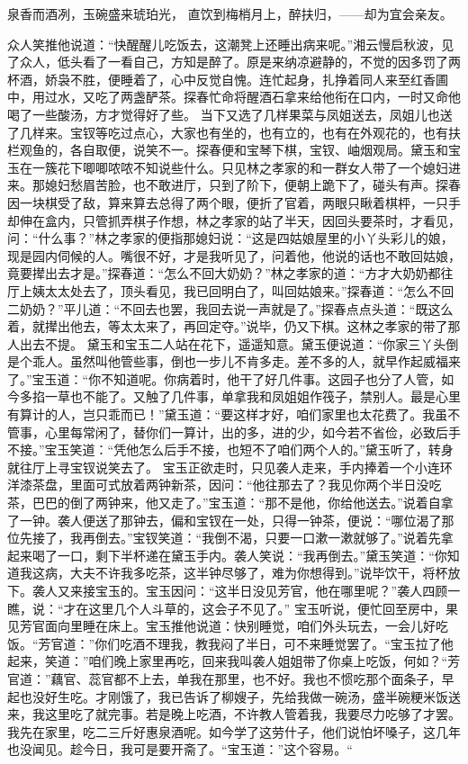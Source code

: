 \documentclass[12pt,oneside]{book}
\begin{document}
泉香而酒冽，玉碗盛来琥珀光，
直饮到梅梢月上，醉扶归，——却为宜会亲友。

众人笑推他说道：“快醒醒儿吃饭去，这潮凳上还睡出病来呢。”湘云慢启秋波，见了众人，低头看了一看自己，方知是醉了。原是来纳凉避静的，不觉的因多罚了两杯酒，娇袅不胜，便睡着了，心中反觉自愧。连忙起身，扎挣着同人来至红香圃中，用过水，又吃了两盏酽茶。探春忙命将醒酒石拿来给他衔在口内，一时又命他喝了一些酸汤，方才觉得好了些。
当下又选了几样果菜与凤姐送去，凤姐儿也送了几样来。宝钗等吃过点心，大家也有坐的，也有立的，也有在外观花的，也有扶栏观鱼的，各自取便，说笑不一。探春便和宝琴下棋，宝钗、岫烟观局。黛玉和宝玉在一簇花下唧唧哝哝不知说些什么。只见林之孝家的和一群女人带了一个媳妇进来。那媳妇愁眉苦脸，也不敢进厅，只到了阶下，便朝上跪下了，碰头有声。探春因一块棋受了敌，算来算去总得了两个眼，便折了官着，两眼只瞅着棋枰，一只手却伸在盒内，只管抓弄棋子作想，林之孝家的站了半天，因回头要茶时，才看见，问：“什么事？”林之孝家的便指那媳妇说：“这是四姑娘屋里的小丫头彩儿的娘，现是园内伺候的人。嘴很不好，才是我听见了，问着他，他说的话也不敢回姑娘，竟要撵出去才是。”探春道：“怎么不回大奶奶？”林之孝家的道：“方才大奶奶都往厅上姨太太处去了，顶头看见，我已回明白了，叫回姑娘来。”探春道：“怎么不回二奶奶？”平儿道：“不回去也罢，我回去说一声就是了。”探春点点头道：“既这么着，就撵出他去，等太太来了，再回定夺。”说毕，仍又下棋。这林之孝家的带了那人出去不提。
黛玉和宝玉二人站在花下，遥遥知意。黛玉便说道：“你家三丫头倒是个乖人。虽然叫他管些事，倒也一步儿不肯多走。差不多的人，就早作起威福来了。”宝玉道：“你不知道呢。你病着时，他干了好几件事。这园子也分了人管，如今多掐一草也不能了。又触了几件事，单拿我和凤姐姐作筏子，禁别人。最是心里有算计的人，岂只乖而已！”黛玉道：“要这样才好，咱们家里也太花费了。我虽不管事，心里每常闲了，替你们一算计，出的多，进的少，如今若不省俭，必致后手不接。”宝玉笑道：“凭他怎么后手不接，也短不了咱们两个人的。”黛玉听了，转身就往厅上寻宝钗说笑去了。
宝玉正欲走时，只见袭人走来，手内捧着一个小连环洋漆茶盘，里面可式放着两钟新茶，因问：“他往那去了？我见你两个半日没吃茶，巴巴的倒了两钟来，他又走了。”宝玉道：“那不是他，你给他送去。”说着自拿了一钟。袭人便送了那钟去，偏和宝钗在一处，只得一钟茶，便说：“哪位渴了那位先接了，我再倒去。”宝钗笑道：“我倒不渴，只要一口漱一漱就够了。”说着先拿起来喝了一口，剩下半杯递在黛玉手内。袭人笑说：“我再倒去。”黛玉笑道：“你知道我这病，大夫不许我多吃茶，这半钟尽够了，难为你想得到。”说毕饮干，将杯放下。袭人又来接宝玉的。宝玉因问：“这半日没见芳官，他在哪里呢？”袭人四顾一瞧，说：“才在这里几个人斗草的，这会子不见了。”
宝玉听说，便忙回至房中，果见芳官面向里睡在床上。宝玉推他说道：快别睡觉，咱们外头玩去，一会儿好吃饭。“芳官道：”你们吃酒不理我，教我闷了半日，可不来睡觉罢了。“宝玉拉了他起来，笑道：”咱们晚上家里再吃，回来我叫袭人姐姐带了你桌上吃饭，何如？“芳官道：”藕官、蕊官都不上去，单我在那里，也不好。我也不惯吃那个面条子，早起也没好生吃。才刚饿了，我已告诉了柳嫂子，先给我做一碗汤，盛半碗粳米饭送来，我这里吃了就完事。若是晚上吃酒，不许教人管着我，我要尽力吃够了才罢。我先在家里，吃二三斤好惠泉酒呢。如今学了这劳什子，他们说怕坏嗓子，这几年也没闻见。趁今日，我可是要开斋了。“宝玉道：”这个容易。“
\end{document}
